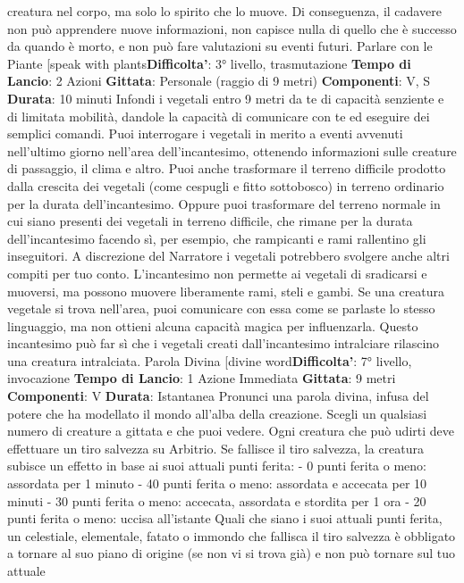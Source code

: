 \begin{multicols}{2}
creatura nel corpo, ma solo lo spirito che lo muove. Di
conseguenza, il cadavere non può apprendere nuove
informazioni, non capisce nulla di quello che è
successo da quando è morto, e non può fare
valutazioni su eventi futuri.
Parlare con le Piante
[speak with plants\textbf{Difficolta'}:
3° livello, trasmutazione
\textbf{Tempo di Lancio}: 2 Azioni
\textbf{Gittata}: Personale (raggio di 9 metri)
\textbf{Componenti}: V, S
\textbf{Durata}: 10 minuti
Infondi i vegetali entro 9 metri da te di capacità
senziente e di limitata mobilità, dandole la capacità di
comunicare con te ed eseguire dei semplici comandi.
Puoi interrogare i vegetali in merito a eventi avvenuti
nell’ultimo giorno nell’area dell’incantesimo, ottenendo
informazioni sulle creature di passaggio, il clima e altro.
Puoi anche trasformare il terreno difficile prodotto dalla
crescita dei vegetali (come cespugli e fitto sottobosco)
in terreno ordinario per la durata dell’incantesimo.
Oppure puoi trasformare del terreno normale in cui
siano presenti dei vegetali in terreno difficile, che
rimane per la durata dell’incantesimo facendo sì, per
esempio, che rampicanti e rami rallentino gli inseguitori.
A discrezione del Narratore i vegetali potrebbero svolgere
anche altri compiti per tuo conto. L’incantesimo non
permette ai vegetali di sradicarsi e muoversi, ma
possono muovere liberamente rami, steli e gambi.
Se una creatura vegetale si trova nell’area, puoi
comunicare con essa come se parlaste lo stesso
linguaggio, ma non ottieni alcuna capacità magica per
influenzarla.
Questo incantesimo può far sì che i vegetali creati
dall’incantesimo intralciare rilascino una creatura
intralciata.
Parola Divina
[divine word\textbf{Difficolta'}:
7° livello, invocazione
\textbf{Tempo di Lancio}: 1 Azione Immediata
\textbf{Gittata}: 9 metri
\textbf{Componenti}: V
\textbf{Durata}: Istantanea
Pronunci una parola divina, infusa del potere che ha
modellato il mondo all’alba della creazione. Scegli un
qualsiasi numero di creature a gittata e che puoi
vedere. Ogni creatura che può udirti deve effettuare un
tiro salvezza su Arbitrio. Se fallisce il tiro salvezza, la
creatura subisce un effetto in base ai suoi attuali punti
ferita:
- 0 punti ferita o meno: assordata per 1 minuto
- 40 punti ferita o meno: assordata e accecata per 10
minuti
- 30 punti ferita o meno: accecata, assordata e
stordita per 1 ora
- 20 punti ferita o meno: uccisa all’istante
Quali che siano i suoi attuali punti ferita, un celestiale,
elementale, fatato o immondo che fallisca il tiro
salvezza è obbligato a tornare al suo piano di origine
(se non vi si trova già) e non può tornare sul tuo attuale

\end{multicols}

